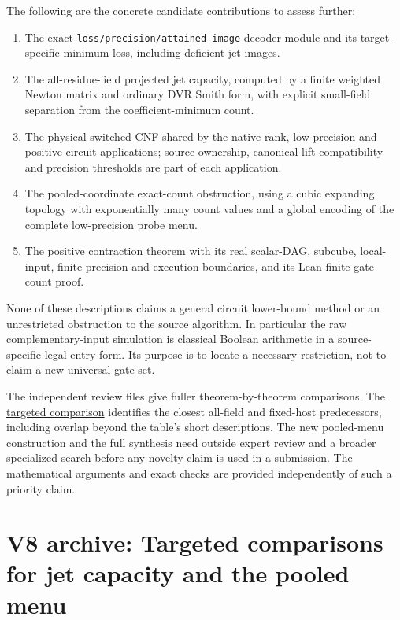 \documentclass[11pt,a4paper]{article}
\providecommand{\tightlist}{\setlength{\itemsep}{0pt}\setlength{\parskip}{0pt}}
\begin{document}
The following are the concrete candidate contributions to assess
further:

\begin{enumerate}
\def\labelenumi{\arabic{enumi}.}
\tightlist
\item
  The exact \nolinkurl{loss/precision/attained-image} decoder module and
  its target-specific minimum loss, including deficient jet images.
\item
  The all-residue-field projected jet capacity, computed by a finite
  weighted Newton matrix and ordinary DVR Smith form, with explicit
  small-field separation from the coefficient-minimum count.
\item
  The physical switched CNF shared by the native rank, low-precision and
  positive-circuit applications; source ownership, canonical-lift
  compatibility and precision thresholds are part of each application.
\item
  The pooled-coordinate exact-count obstruction, using a cubic expanding
  topology with exponentially many count values and a global encoding of
  the complete low-precision probe menu.
\item
  The positive contraction theorem with its real scalar-DAG, subcube,
  local-input, finite-precision and execution boundaries, and its Lean
  finite gate-count proof.
\end{enumerate}

None of these descriptions claims a general circuit lower-bound method
or an unrestricted obstruction to the source algorithm. In particular
the raw complementary-input simulation is classical Boolean arithmetic
in a source-specific legal-entry form. Its purpose is to locate a
necessary restriction, not to claim a new universal gate set.

The independent review files give fuller theorem-by-theorem comparisons.
The \hyperref[v8-section-final-targeted-audit]{targeted comparison}
identifies the closest all-field and fixed-host predecessors, including
overlap beyond the table's short descriptions. The new pooled-menu
construction and the full synthesis need outside expert review and a
broader specialized search before any novelty claim is used in a
submission. The mathematical arguments and exact checks are provided
independently of such a priority claim.

\section{V8 archive: Targeted comparisons for jet capacity and the pooled menu}\label{v8-section-final-targeted-audit}
\end{document}

